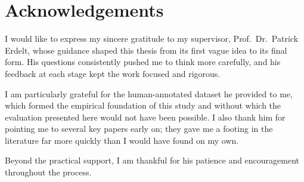 \section*{Acknowledgements}

\begingroup
\setlength{\parskip}{1.6ex plus 0.4ex minus 0.2ex}

I would like to express my sincere gratitude to my supervisor,
Prof.~Dr.~Patrick Erdelt, whose guidance shaped this thesis from its first
vague idea to its final form. His questions consistently pushed me to think
more carefully, and his feedback at each stage kept the work focused and
rigorous.

I am particularly grateful for the human-annotated dataset he provided to me,
which formed the empirical foundation of this study and without which the
evaluation presented here would not have been possible. I also thank him for
pointing me to several key papers early on; they gave me a footing in the
literature far more quickly than I would have found on my own.

Beyond the practical support, I am thankful for his patience and encouragement
throughout the process.

\par
\endgroup

\clearpage
